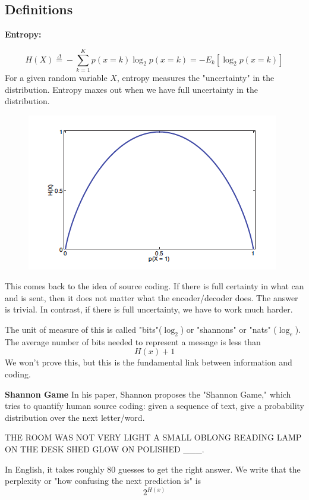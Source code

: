 \documentclass{article}
\begin{document}
\subsection{Definitions}

\textbf{Entropy:}

$$H(X) \overset{\Delta}{=}  - \sum_{k=1}^K p(x=k) \log_2 p(x = k) = -E_k[\log_2 p(x=k)]$$
For a given random variable $X$, entropy measures the "uncertainty" in the distribution. Entropy maxes out when we have full uncertainty in the distribution. 

\begin{figure}[h!]
\centering
\includegraphics[scale=0.45]{13/parabola.png}
\label{fig:univerise}
\end{figure}

\pagebreak
\smallskip
This comes back to the idea of source coding. If there is full certainty in what can and is sent, then it does not matter what the encoder/decoder does. The answer is trivial. In contrast, if there is full uncertainty, we have to work much harder.

\smallskip
The unit of measure of this is called "bits"($\log_2$) or "shannons" or "nats" ($\log_e$). The average number of bits needed to represent a message is less than $$H(x) + 1$$ We won't prove this, but this is the fundamental link between information and coding.

\smallskip
\smallskip
\textbf{Shannon Game}
In his paper, Shannon proposes the "Shannon Game," which tries to quantify human source coding: given a sequence of text, give a probability distribution over the next letter/word.

\smallskip
THE ROOM WAS NOT VERY LIGHT A SMALL OBLONG READING LAMP ON THE DESK SHED GLOW ON POLISHED \_\_\_.

\smallskip
\smallskip
In English, it takes roughly 80 guesses to get the right answer. We write that the perplexity or "how confusing the next prediction is" is
$$2^{H(x)}$$
\end{document}
